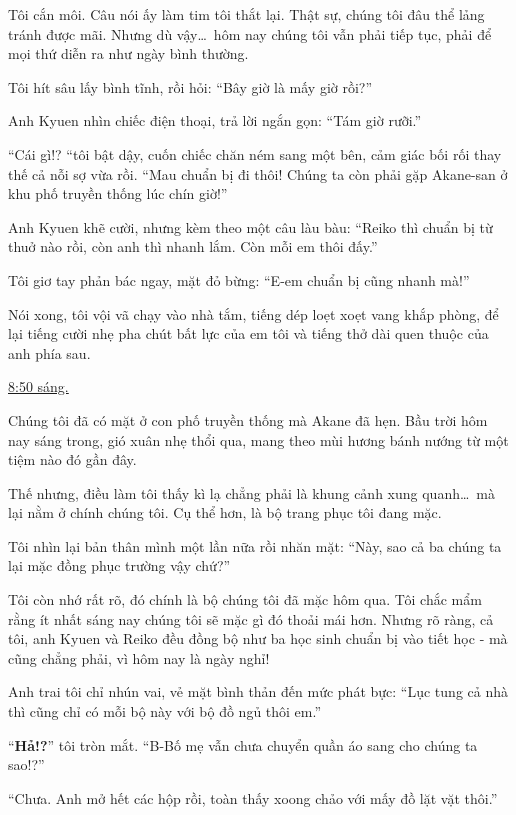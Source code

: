 \documentclass[../main.tex]{subfiles}
\begin{document}
Tôi cắn môi. Câu nói ấy làm tim tôi thắt lại. Thật sự, chúng tôi đâu thể lảng tránh được mãi. Nhưng dù vậy\dots\ hôm nay chúng tôi vẫn phải tiếp tục, phải để mọi thứ diễn ra như ngày bình thường.

Tôi hít sâu lấy bình tĩnh, rồi hỏi: ``Bây giờ là mấy giờ rồi?''

Anh Kyuen nhìn chiếc điện thoại, trả lời ngắn gọn: ``Tám giờ rưỡi.''

``Cái gì!? ``tôi bật dậy, cuốn chiếc chăn ném sang một bên, cảm giác bối rối thay thế cả nỗi sợ vừa rồi. ``Mau chuẩn bị đi thôi! Chúng ta còn phải gặp Akane-san ở khu phố truyền thống lúc chín giờ!''

Anh Kyuen khẽ cười, nhưng kèm theo một câu làu bàu: ``Reiko thì chuẩn bị từ thuở nào rồi, còn anh thì nhanh lắm. Còn mỗi em thôi đấy.''

Tôi giơ tay phản bác ngay, mặt đỏ bừng: ``E-em chuẩn bị cũng nhanh mà!''

Nói xong, tôi vội vã chạy vào nhà tắm, tiếng dép loẹt xoẹt vang khắp phòng, để lại tiếng cười nhẹ pha chút bất lực của em tôi và tiếng thở dài quen thuộc của anh phía sau.

\begin{center}
  \uline{8:50 sáng.}
\end{center}

Chúng tôi đã có mặt ở con phố truyền thống mà Akane đã hẹn. Bầu trời hôm nay sáng trong, gió xuân nhẹ thổi qua, mang theo mùi hương bánh nướng từ một tiệm nào đó gần đây.

Thế nhưng, điều làm tôi thấy kì lạ chẳng phải là khung cảnh xung quanh\dots\ mà lại nằm ở chính chúng tôi. Cụ thể hơn, là bộ trang phục tôi đang mặc.

Tôi nhìn lại bản thân mình một lần nữa rồi nhăn mặt: ``Này, sao cả ba chúng ta lại mặc đồng phục trường vậy chứ?''

Tôi còn nhớ rất rõ, đó chính là bộ chúng tôi đã mặc hôm qua. Tôi chắc mẩm rằng ít nhất sáng nay chúng tôi sẽ mặc gì đó thoải mái hơn. Nhưng rõ ràng, cả tôi, anh Kyuen và Reiko đều đồng bộ như ba học sinh chuẩn bị vào tiết học - mà cũng chẳng phải, vì hôm nay là ngày nghỉ!

Anh trai tôi chỉ nhún vai, vẻ mặt bình thản đến mức phát bực: ``Lục tung cả nhà thì cũng chỉ có mỗi bộ này với bộ đồ ngủ thôi em.''

``\textbf{Hả!?}'' tôi tròn mắt. ``B-Bố mẹ vẫn chưa chuyển quần áo sang cho chúng ta sao!?''

``Chưa. Anh mở hết các hộp rồi, toàn thấy xoong chảo với mấy đồ lặt vặt thôi.''
\end{document}
